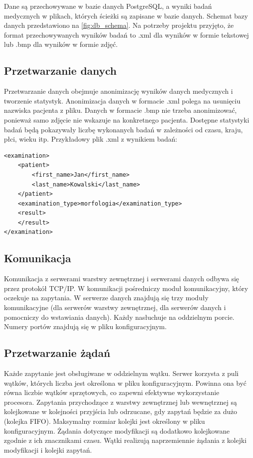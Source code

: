 Dane są przechowywane w bazie danych PostgreSQL, a wyniki badań medycznych w plikach, których ścieżki są zapisane w bazie danych. Schemat bazy danych przedstawiono na \ref{fig:db_schema}. Na potrzeby projektu przyjęto, że format przechowywanych wyników badań to .xml dla wyników w formie tekstowej lub .bmp dla wyników w formie zdjęć.


\subsection{Przetwarzanie danych}

Przetwarzanie danych obejmuje anonimizację wyników danych medycznych i tworzenie statystyk. Anonimizacja danych w formacie .xml polega na usunięciu nazwiska pacjenta z pliku. Danych w formacie .bmp nie trzeba anonimizować, ponieważ samo zdjęcie nie wskazuje na konkretnego pacjenta. Dostępne statystyki badań będą pokazywały liczbę wykonanych badań w zależności od czasu, kraju, płci, wieku itp.
Przykładowy plik .xml z wynikiem badań:
\begin{lstlisting}[style=incode]
<examination>
    <patient>
        <first_name>Jan</first_name>
        <last_name>Kowalski</last_name>
    </patient>
    <examination_type>morfologia</examination_type>
    <result>
    </result>
</examination>
\end{lstlisting}


\subsection{Komunikacja}
Komunikacja z serwerami warstwy zewnętrznej i serwerami danych odbywa się przez protokół TCP/IP. W komunikacji pośredniczy moduł komunikacyjny, który oczekuje na zapytania. W serwerze danych znajdują się trzy moduły komunikacyjne (dla serwerów warstwy zewnętrznej, dla serwerów danych i pomocniczy do wstawiania danych). Każdy nasłuchuje na oddzielnym porcie. Numery portów znajdują się w pliku konfiguracyjnym. 

\subsection{Przetwarzanie żądań}
Każde zapytanie jest obsługiwane w oddzielnym wątku. Serwer korzysta z puli wątków, których liczba jest określona w pliku konfiguracyjnym. Powinna ona być równa liczbie wątków sprzętowych, co zapewni efektywne wykorzystanie procesora. Zapytania przychodzące z warstwy zewnętrznej lub wewnętrznej są kolejkowane w kolejności przyjścia lub odrzucane, gdy zapytań będzie za dużo (kolejka FIFO). Maksymalny rozmiar kolejki jest określony w pliku konfiguracyjnym. Żądania dotyczące modyfikacji są dodatkowo kolejkowane zgodnie z ich znacznikami czasu. Wątki realizują naprzemiennie żądania z kolejki modyfikacji i kolejki zapytań.

